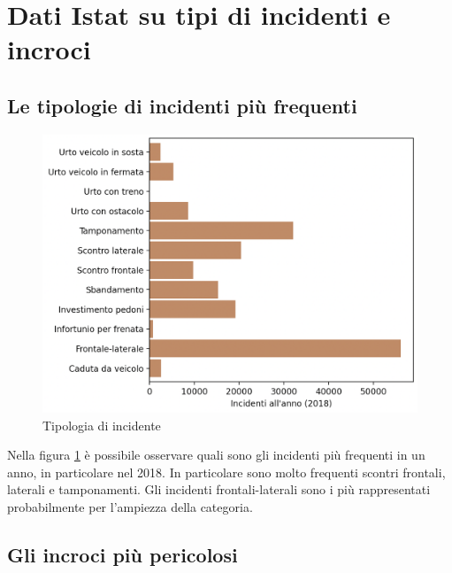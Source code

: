 \documentclass[a4paper]{report}
\begin{document}

\section{Dati Istat su tipi di incidenti e incroci}

\subsection{Le tipologie di incidenti più frequenti}

\begin{figure}
    \includegraphics[width=\linewidth]{../src/incidenti/incidenti_senza_coords/localizzazione_incidente/tipo_incidente.png}
    \caption{Tipologia di incidente}
    \label{fig:tipo-incidente}
\end{figure}

Nella figura \ref{fig:tipo-incidente} è possibile osservare quali sono gli incidenti più frequenti in un 
anno, in particolare nel 2018.
In particolare sono molto frequenti scontri frontali, laterali e tamponamenti. 
Gli incidenti frontali-laterali sono i più rappresentati probabilmente per l'ampiezza della categoria.

\subsection{Gli incroci più pericolosi}
\end{document}
